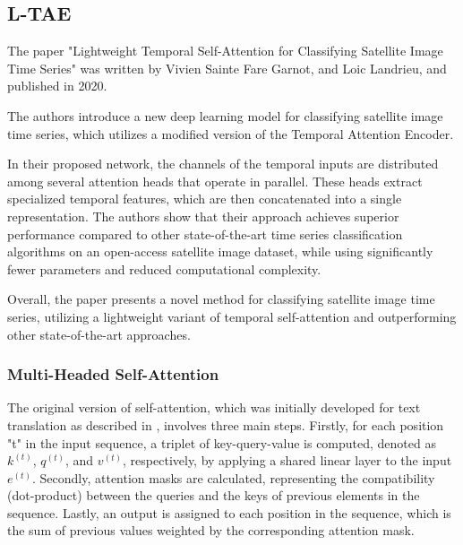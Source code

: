 \subsection{L-TAE}
The paper "Lightweight Temporal Self-Attention for Classifying Satellite Image Time Series" \cite{LTAE} was written by Vivien Sainte Fare Garnot, and Loic Landrieu, and published in 2020.

The authors introduce a new deep learning model for classifying satellite image time series, which utilizes a modified version of the Temporal Attention Encoder.

In their proposed network, the channels of the temporal inputs are distributed among several attention heads that operate in parallel. These heads extract specialized temporal features, which are then concatenated into a single representation. The authors show that their approach achieves superior performance compared to other state-of-the-art time series classification algorithms on an open-access satellite image dataset, while using significantly fewer parameters and reduced computational complexity.

Overall, the paper presents a novel method for classifying satellite image time series, utilizing a lightweight variant of temporal self-attention and outperforming other state-of-the-art approaches.

\subsubsection{Multi-Headed Self-Attention}

The original version of self-attention, which was initially developed for text translation as described in \cite{vaswani}, involves three main steps.
Firstly, for each position "t" in the input sequence, a triplet of key-query-value is computed, denoted as $k^{(t)}$, $q^{(t)}$, and $v^{(t)}$, respectively, by applying a shared linear layer to the input $e^{(t)}$.
Secondly, attention masks are calculated, representing the compatibility (dot-product) between the queries and the keys of previous elements in the sequence. 
Lastly, an output is assigned to each position in the sequence, which is the sum of previous values weighted by the corresponding attention mask.

